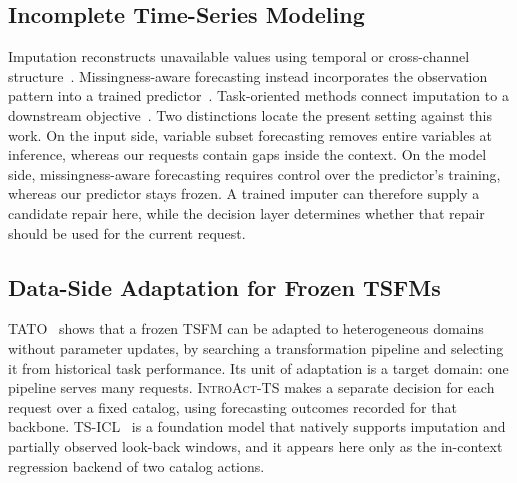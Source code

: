 \documentclass{article}
\newcommand{\introact}{\textsc{IntroAct-TS}}
\newcommand{\tsfm}{TSFM}
\begin{document}
\subsection{Incomplete Time-Series Modeling}
\label{sec:related-incomplete}
Imputation reconstructs unavailable values using temporal or cross-channel
structure~\citep{cao2018brits,tashiro2021csdi,yoon2018gain,wu2023timesnet,du2023saits,wang2025pswi,park2026t1}.
Missingness-aware forecasting instead incorporates the observation pattern into a trained
predictor~\citep{chen2024bitgraph,peng2025s4m,jang2026channeltokenformer}.
Task-oriented methods connect imputation to a downstream
objective~\citep{wang2024taskoriented,hao2025toivsf,hao2025gimcc,liang2025vida,xu2026srdi}.
Two distinctions locate the present setting against this work. On the input side, variable
subset forecasting removes entire variables at inference, whereas our requests contain gaps
inside the context. On the model side, missingness-aware forecasting requires control over
the predictor's training, whereas our predictor stays frozen. A trained imputer can therefore
supply a candidate repair here, while the decision layer determines whether that repair
should be used for the current request.

\subsection{Data-Side Adaptation for Frozen \tsfm{}s}
\label{sec:related-dataside}
TATO~\citep{qiu2026tato} shows that a frozen \tsfm{} can be adapted to heterogeneous domains
without parameter updates, by searching a transformation pipeline and selecting it from
historical task performance. Its unit of adaptation is a target domain: one pipeline serves
many requests. \introact{} makes a separate decision for each request over a fixed catalog,
using forecasting outcomes recorded for that backbone. TS-ICL~\citep{tsicl2026} is a
foundation model that natively supports imputation and partially observed look-back windows,
and it appears here only as the in-context regression backend of two catalog actions.
\end{document}
